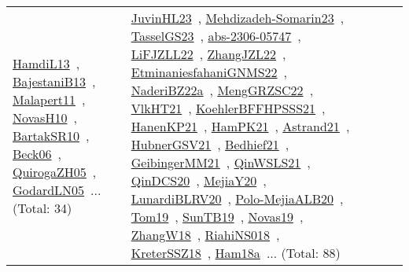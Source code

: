 {\begin{longtable}{lp{3cm}>{\raggedright\arraybackslash}p{6cm}>{\raggedright\arraybackslash}p{6cm}>{\raggedright\arraybackslash}p{8cm}}
\href{../works/HamdiL13.pdf}{HamdiL13}~\cite{HamdiL13}, \href{../works/BajestaniB13.pdf}{BajestaniB13}~\cite{BajestaniB13}, \href{../works/Malapert11.pdf}{Malapert11}~\cite{Malapert11}, \href{../works/NovasH10.pdf}{NovasH10}~\cite{NovasH10}, \href{../works/BartakSR10.pdf}{BartakSR10}~\cite{BartakSR10}, \href{../works/Beck06.pdf}{Beck06}~\cite{Beck06}, \href{../works/QuirogaZH05.pdf}{QuirogaZH05}~\cite{QuirogaZH05}, \href{../works/GodardLN05.pdf}{GodardLN05}~\cite{GodardLN05}... (Total: 34) & \href{../works/JuvinHL23.pdf}{JuvinHL23}~\cite{JuvinHL23}, \href{../works/Mehdizadeh-Somarin23.pdf}{Mehdizadeh-Somarin23}~\cite{Mehdizadeh-Somarin23}, \href{../works/TasselGS23.pdf}{TasselGS23}~\cite{TasselGS23}, \href{../works/abs-2306-05747.pdf}{abs-2306-05747}~\cite{abs-2306-05747}, \href{../works/LiFJZLL22.pdf}{LiFJZLL22}~\cite{LiFJZLL22}, \href{../works/ZhangJZL22.pdf}{ZhangJZL22}~\cite{ZhangJZL22}, \href{../works/EtminaniesfahaniGNMS22.pdf}{EtminaniesfahaniGNMS22}~\cite{EtminaniesfahaniGNMS22}, \href{../works/NaderiBZ22a.pdf}{NaderiBZ22a}~\cite{NaderiBZ22a}, \href{../works/MengGRZSC22.pdf}{MengGRZSC22}~\cite{MengGRZSC22}, \href{../works/VlkHT21.pdf}{VlkHT21}~\cite{VlkHT21}, \href{../works/KoehlerBFFHPSSS21.pdf}{KoehlerBFFHPSSS21}~\cite{KoehlerBFFHPSSS21}, \href{../works/HanenKP21.pdf}{HanenKP21}~\cite{HanenKP21}, \href{../works/HamPK21.pdf}{HamPK21}~\cite{HamPK21}, \href{../works/Astrand21.pdf}{Astrand21}~\cite{Astrand21}, \href{../works/HubnerGSV21.pdf}{HubnerGSV21}~\cite{HubnerGSV21}, \href{../works/Bedhief21.pdf}{Bedhief21}~\cite{Bedhief21}, \href{../works/GeibingerMM21.pdf}{GeibingerMM21}~\cite{GeibingerMM21}, \href{../works/QinWSLS21.pdf}{QinWSLS21}~\cite{QinWSLS21}, \href{../works/QinDCS20.pdf}{QinDCS20}~\cite{QinDCS20}, \href{../works/MejiaY20.pdf}{MejiaY20}~\cite{MejiaY20}, \href{../works/LunardiBLRV20.pdf}{LunardiBLRV20}~\cite{LunardiBLRV20}, \href{../works/Polo-MejiaALB20.pdf}{Polo-MejiaALB20}~\cite{Polo-MejiaALB20}, \href{../works/Tom19.pdf}{Tom19}~\cite{Tom19}, \href{../works/SunTB19.pdf}{SunTB19}~\cite{SunTB19}, \href{../works/Novas19.pdf}{Novas19}~\cite{Novas19}, \href{../works/ZhangW18.pdf}{ZhangW18}~\cite{ZhangW18}, \href{../works/RiahiNS018.pdf}{RiahiNS018}~\cite{RiahiNS018}, \href{../works/KreterSSZ18.pdf}{KreterSSZ18}~\cite{KreterSSZ18}, \href{../works/Ham18a.pdf}{Ham18a}~\cite{Ham18a}... (Total: 88)\\

\end{longtable}}
